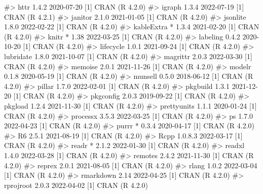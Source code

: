 \documentclass[
  11pt,
  letterpaper,
  DIV=11,
  numbers=noendperiod]{scrartcl}
\newenvironment{Shaded}{}{}
\newcommand{\CommentTok}[1]{\textcolor[rgb]{0.42,0.45,0.49}{#1}}
\begin{document}
\begin{Shaded}
\begin{Highlighting}[]
\CommentTok{\#\textgreater{}  httr          1.4.2     2020{-}07{-}20 [1] CRAN (R 4.2.0)}
\CommentTok{\#\textgreater{}  igraph        1.3.4     2022{-}07{-}19 [1] CRAN (R 4.2.1)}
\CommentTok{\#\textgreater{}  janitor       2.1.0     2021{-}01{-}05 [1] CRAN (R 4.2.0)}
\CommentTok{\#\textgreater{}  jsonlite      1.8.0     2022{-}02{-}22 [1] CRAN (R 4.2.0)}
\CommentTok{\#\textgreater{}  kableExtra  * 1.3.4     2021{-}02{-}20 [1] CRAN (R 4.2.0)}
\CommentTok{\#\textgreater{}  knitr       * 1.38      2022{-}03{-}25 [1] CRAN (R 4.2.0)}
\CommentTok{\#\textgreater{}  labeling      0.4.2     2020{-}10{-}20 [1] CRAN (R 4.2.0)}
\CommentTok{\#\textgreater{}  lifecycle     1.0.1     2021{-}09{-}24 [1] CRAN (R 4.2.0)}
\CommentTok{\#\textgreater{}  lubridate     1.8.0     2021{-}10{-}07 [1] CRAN (R 4.2.0)}
\CommentTok{\#\textgreater{}  magrittr      2.0.3     2022{-}03{-}30 [1] CRAN (R 4.2.0)}
\CommentTok{\#\textgreater{}  memoise       2.0.1     2021{-}11{-}26 [1] CRAN (R 4.2.0)}
\CommentTok{\#\textgreater{}  modelr        0.1.8     2020{-}05{-}19 [1] CRAN (R 4.2.0)}
\CommentTok{\#\textgreater{}  munsell       0.5.0     2018{-}06{-}12 [1] CRAN (R 4.2.0)}
\CommentTok{\#\textgreater{}  pillar        1.7.0     2022{-}02{-}01 [1] CRAN (R 4.2.0)}
\CommentTok{\#\textgreater{}  pkgbuild      1.3.1     2021{-}12{-}20 [1] CRAN (R 4.2.0)}
\CommentTok{\#\textgreater{}  pkgconfig     2.0.3     2019{-}09{-}22 [1] CRAN (R 4.2.0)}
\CommentTok{\#\textgreater{}  pkgload       1.2.4     2021{-}11{-}30 [1] CRAN (R 4.2.0)}
\CommentTok{\#\textgreater{}  prettyunits   1.1.1     2020{-}01{-}24 [1] CRAN (R 4.2.0)}
\CommentTok{\#\textgreater{}  processx      3.5.3     2022{-}03{-}25 [1] CRAN (R 4.2.0)}
\CommentTok{\#\textgreater{}  ps            1.7.0     2022{-}04{-}23 [1] CRAN (R 4.2.0)}
\CommentTok{\#\textgreater{}  purrr       * 0.3.4     2020{-}04{-}17 [1] CRAN (R 4.2.0)}
\CommentTok{\#\textgreater{}  R6            2.5.1     2021{-}08{-}19 [1] CRAN (R 4.2.0)}
\CommentTok{\#\textgreater{}  Rcpp          1.0.8.3   2022{-}03{-}17 [1] CRAN (R 4.2.0)}
\CommentTok{\#\textgreater{}  readr       * 2.1.2     2022{-}01{-}30 [1] CRAN (R 4.2.0)}
\CommentTok{\#\textgreater{}  readxl        1.4.0     2022{-}03{-}28 [1] CRAN (R 4.2.0)}
\CommentTok{\#\textgreater{}  remotes       2.4.2     2021{-}11{-}30 [1] CRAN (R 4.2.0)}
\CommentTok{\#\textgreater{}  reprex        2.0.1     2021{-}08{-}05 [1] CRAN (R 4.2.0)}
\CommentTok{\#\textgreater{}  rlang         1.0.2     2022{-}03{-}04 [1] CRAN (R 4.2.0)}
\CommentTok{\#\textgreater{}  rmarkdown     2.14      2022{-}04{-}25 [1] CRAN (R 4.2.0)}
\CommentTok{\#\textgreater{}  rprojroot     2.0.3     2022{-}04{-}02 [1] CRAN (R 4.2.0)}

\end{Highlighting}
\end{Shaded}
\end{document}
